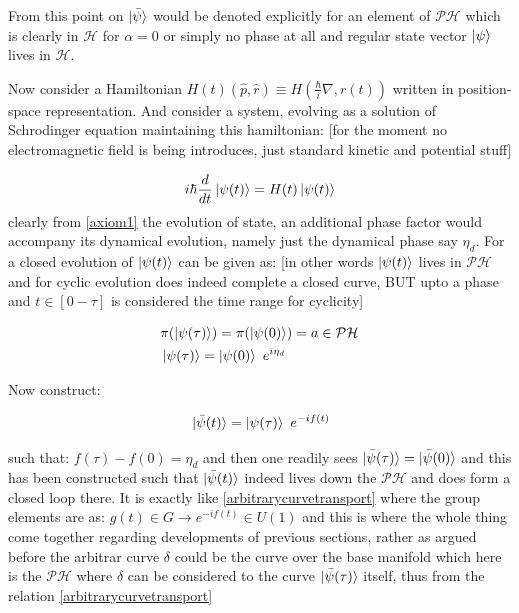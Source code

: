 \documentclass[8pt, twocoloumn]{article}
\begin{document}
From this point on $\ket{\bar{\psi}}$ would be denoted explicitly for an element of $\mathcal{PH}$ which is clearly in $\mathcal{H}$ for $\alpha = 0$ or simply no phase at all and regular state vector $\ket{\psi}$ lives in $\mathcal{H}$.

Now consider a Hamiltonian $H(t)(\hat{p}, \hat{r}) \equiv H(\frac{\hbar}{i}\nabla, r(t))$ written in position-space representation. And consider a system, evolving as a solution of Schrodinger equation maintaining this hamiltonian: [for the moment no electromagnetic field is being introduces, just standard kinetic and potential stuff]

\begin{align}
    i\hbar\frac{d}{dt} \ket{\psi(t)} = H(t) \ket{\psi(t)}
\end{align}
clearly from \ref{axiom1} the evolution of state, an additional phase factor would accompany its dynamical evolution, namely just the dynamical phase say $\eta_d$. For a closed evolution of $\ket{\psi(t)}$ can be given as:  [in other words $\ket{\psi(t)}$ lives in $\mathcal{PH}$ and for cyclic evolution does indeed complete a closed curve, BUT upto a phase and $t \in [0-\tau]$ is considered the time range for cyclicity]

\begin{align}{\label{pihere}}
    & \pi(\ket{\psi(\tau)}) = \pi(\ket{\psi(0)}) = a \in \mathcal{PH} \\ 
    & \ket{\psi(\tau)} = \ket{\psi(0)} \  e^{i \eta_d}
\end{align}

Now construct:

\begin{align}{\label{newhorihori}}
    \ket{\bar{\psi}(t)}= \ket{\psi(\tau)} \ e^{-if(t)}
\end{align}

such that: $f(\tau) - f(0) = \eta_d$ and then one readily sees $\ket{\bar{\psi}(\tau)} = \ket{\bar{\psi}(0)}$ and this has been constructed such that $\ket{\bar{\psi}(t)}$ indeed lives down the $\mathcal{PH}$ and does form a closed loop there. It is exactly like \ref{arbitrarycurvetransport} where the group elements are as: $g(t) \in G \to e^{-if(t)} \in U(1)$ and this is where the whole thing come together regarding developments of previous sections, rather as argued before the arbitrar curve $\delta$ could be the curve over the base manifold which here is the $\mathcal{PH}$ where $\delta$ can be considered to the curve $\ket{\bar{\psi}(\tau)}$ itself, thus from the relation \ref{arbitrarycurvetransport}
\end{document}
